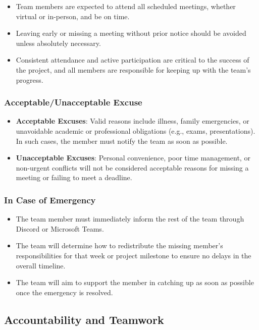 \documentclass{article}
\begin{document}
\begin{itemize}
    \item Team members are expected to attend all scheduled meetings, whether virtual or in-person, and be on time.
    \item Leaving early or missing a meeting without prior notice should be avoided unless absolutely necessary.
    \item Consistent attendance and active participation are critical to the success of the project, and all members are responsible for keeping up with the team's progress.
\end{itemize}

\subsubsection*{Acceptable/Unacceptable Excuse}

\begin{itemize}
    \item \textbf{Acceptable Excuses}: 
    Valid reasons include illness, family emergencies, or unavoidable academic or professional obligations (e.g., exams, presentations). In such cases, the member must notify the team as soon as possible.
    \item \textbf{Unacceptable Excuses}: 
    Personal convenience, poor time management, or non-urgent conflicts will not be considered acceptable reasons for missing a meeting or failing to meet a deadline.
\end{itemize}

\subsubsection*{In Case of Emergency}

\begin{itemize}
    \item The team member must immediately inform the rest of the team through Discord or Microsoft Teams.
    \item The team will determine how to redistribute the missing member's responsibilities for that week or project milestone to ensure no delays in the overall timeline.
    \item The team will aim to support the member in catching up as soon as possible once the emergency is resolved.
\end{itemize}

\subsection*{Accountability and Teamwork}
\end{document}
